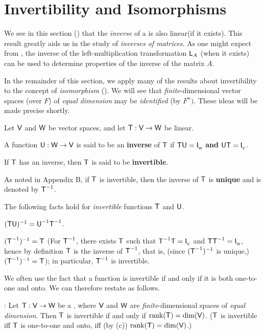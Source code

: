 \section{Invertibility and Isomorphisms} \label{sec 2.4}

We see in this section () that the \emph{inverse} of a \LTRAN{} is also linear(if it exists).
This result greatly aids us in the study of \emph{inverses of matrices}.
As one might expect from , the inverse of the left-multiplication transformation \(\textsf{L}_A\) (when it exists) can be used to determine properties of the inverse of the matrix \(A\).

In the remainder of this section, we apply many of the results about invertibility to the concept of \emph{isomorphism} ().
We will see that \emph{finite}-dimensional vector spaces (over \(F\)) of \emph{equal dimension} may be \emph{identified} (by \(F^n)\).
These ideas will be made precise shortly.

\begin{definition} \label{def 2.12}
Let \(\textsf{V}\) and \(\textsf{W}\) be vector spaces, and let \(\textsf{T} : \textsf{V} \to \textsf{W}\) be linear.

 A function \(\textsf{U}: \textsf{W} \to \textsf{V}\) is said to be an \textbf{inverse} of \(\textsf{T}\) if \(\textsf{T}\textsf{U} = \textsf{I}_{_{\textsf{W}}}\) \textbf{and} \(\textsf{U}\textsf{T} = \textsf{I}_{_{\textsf{V}}}\).

 If \(\textsf{T}\) has an inverse, then \(\textsf{T}\) is said to be \textbf{invertible}.

 As noted in Appendix B, if \(\textsf{T}\) is invertible, then the inverse of \(\textsf{T}\) is \textbf{unique} and is denoted by \(\textsf{T}^{-1}\).
\end{definition}

\begin{additional theorem} \label{athm 2.35}
The following facts hold for \emph{invertible} functions \(\textsf{T}\) and \(\textsf{U}\).

 \((\textsf{T}\textsf{U})^{-1} = \textsf{U}^{-1} \textsf{T}^{-1}\).

 \((\textsf{T}^{-1})^{-1} = \textsf{T}\)
(For \(\textsf{T}^{-1}\), there exists \(\textsf{T}\) such that \(\textsf{T}^{-1}\textsf{T} = \textsf{I}_{_{\textsf{V}}}\) and \(\textsf{T}\textsf{T}^{-1} = \textsf{I}_{_{\textsf{W}}}\),
hence by definition \(\textsf{T}\) is the inverse of \(\textsf{T}^{-1}\), that is, (since \((\textsf{T}^{-1})^{-1}\) is unique,) \((\textsf{T}^{-1})^{-1} = \textsf{T}\));
in particular, \(\textsf{T}^{-1}\) is invertible.

We often use the fact that a function is invertible if and only if it is both one-to-one and onto.
We can therefore restate  as follows.

: Let \(\textsf{T} : \textsf{V} \to \textsf{W}\) be a \LTRAN{}, where \(\textsf{V}\) and \(\textsf{W}\) are \emph{finite}-dimensional spaces of \emph{equal dimension}.
Then \(\textsf{T}\) is invertible if and only if \(\mathrm{rank}(\textsf{T}) = \dim(\textsf{V})\).
(\(\textsf{T}\) is invertible iff \(\textsf{T}\) is one-to-one and onto, iff (by (c)) \(\mathrm{rank}(\textsf{T}) = \dim(\textsf{V})\).)
\end{additional theorem}

